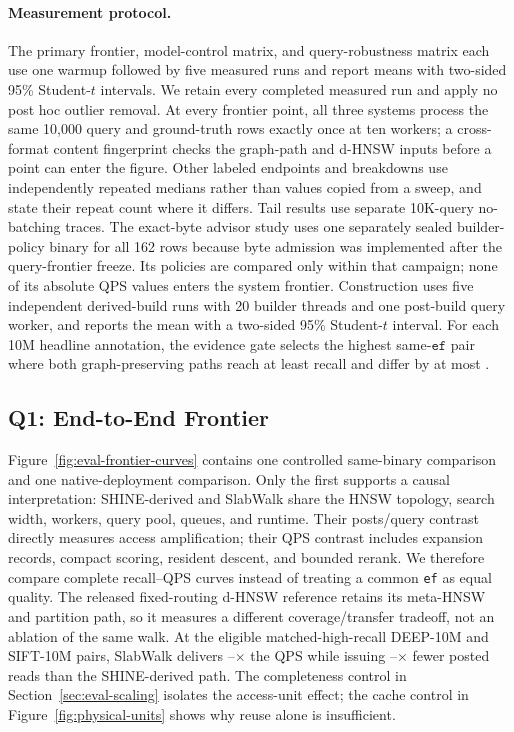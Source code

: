 \documentclass[sigconf,nonacm]{acmart}
\newcommand{\sys}{SlabWalk}
\newcommand{\ef}{\texttt{ef}}
\begin{document}
\paragraph{Measurement protocol.}
The primary frontier, model-control matrix, and query-robustness matrix each
use one warmup followed by five measured runs and report means with two-sided
95\% Student-$t$ intervals.  We retain every completed measured run and apply
no post hoc outlier removal.  At every frontier point, all three systems process
the same 10,000 query and ground-truth rows exactly once at ten workers; a
cross-format content fingerprint checks the graph-path and d-HNSW inputs before a
point can enter the figure.  Other labeled endpoints and breakdowns use
independently repeated medians rather than values copied from a sweep, and state
their repeat count where it differs.  Tail results use separate 10K-query
no-batching traces.  The exact-byte advisor study uses one separately sealed
builder-policy binary for all 162 rows because byte admission was implemented
after the query-frontier freeze.  Its policies are compared only within that
campaign; none of its absolute QPS values enters the system frontier.
Construction uses five independent derived-build runs with
20 builder threads and one post-build query worker, and reports the mean with a
two-sided 95\% Student-$t$ interval.
For each 10M headline annotation, the evidence gate selects the highest
same-$\ef$ pair where both graph-preserving paths reach at least
\ClaimFrontierRecallFloor{} recall and differ by at most
\ClaimFrontierRecallTolerance{}.

\subsection{Q1: End-to-End Frontier}
\label{sec:eval-overall}

Figure~\ref{fig:eval-frontier-curves} contains one controlled same-binary
comparison and one native-deployment comparison.  Only the first supports a
causal interpretation: SHINE-derived and \sys{} share the HNSW
topology, search width, workers, query pool, queues, and runtime.  Their
posts/query contrast directly measures access amplification; their QPS contrast
includes expansion records, compact scoring, resident descent, and bounded
rerank.  We therefore compare complete recall--QPS curves instead of treating a
common \ef{} as equal quality.  The released fixed-routing
d-HNSW reference retains its meta-HNSW and partition path, so it measures a
different coverage/transfer tradeoff, not an ablation of the same walk.
At the eligible matched-high-recall DEEP-10M and SIFT-10M pairs, \sys{}
delivers \ClaimFrontierQpsMin--\ClaimFrontierQpsMax$\times$ the QPS
while issuing \ClaimFrontierPostsMin--\ClaimFrontierPostsMax$\times$ fewer
posted reads than the SHINE-derived path.  The completeness control in
Section~\ref{sec:eval-scaling} isolates the access-unit effect; the cache control
in Figure~\ref{fig:physical-units} shows why reuse alone is insufficient.
\end{document}
